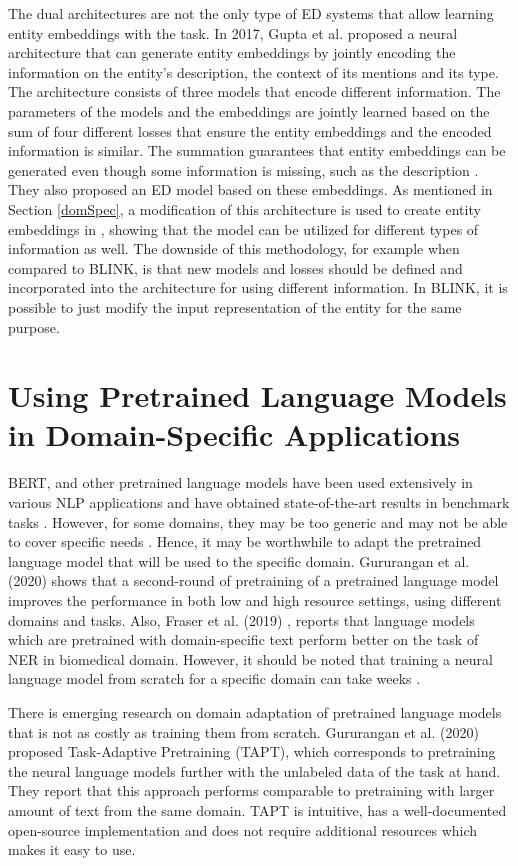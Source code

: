 \documentclass{report}
\theoremstyle{definition}
\theoremstyle{remark}
\begin{document}
The dual architectures are not the only type of ED systems that allow learning entity embeddings with the task. In 2017, Gupta et al. \cite{gupta} proposed a neural architecture that can generate entity embeddings by jointly encoding the information on the entity's description, the context of its mentions and its type. The architecture consists of three models that encode different information. The parameters of the models and the embeddings are jointly learned based on the sum of four different losses that ensure the entity embeddings and the encoded information is similar. The summation guarantees that entity embeddings can be generated even though some information is missing, such as the description \cite{gupta}. They also proposed an ED model based on these embeddings. As mentioned in Section \ref{domSpec}, a modification of this architecture is used to create entity embeddings in \cite{cosmetic}, showing that the model can be utilized for different types of information as well. The downside of this methodology, for example when compared to BLINK, is that new models and losses should be defined and incorporated into the architecture for using different information. In BLINK, it is possible to just modify the input representation of the entity for the same purpose.

\section{Using Pretrained Language Models in Domain-Specific Applications}
\label{preLMDiffDomain}
BERT, and other pretrained language models have been used extensively in various NLP applications and have obtained state-of-the-art results in benchmark tasks \cite{pretrainedLM}. However, for some domains, they may be too generic and may not be able to cover specific needs \cite{quote2}. Hence, it may be worthwhile to adapt the pretrained language model that will be used to the specific domain. Gururangan et al. (2020) \cite{DontStop} shows that a second-round of pretraining of a pretrained language model improves the performance in both low and high resource settings, using different domains and tasks. Also, Fraser et al. (2019) \cite{quote3}, reports that language models which are pretrained with domain-specific text perform better on the task of NER in biomedical domain. However, it should be noted that training a neural language model from scratch for a specific domain can take weeks \cite{tritrain}. 

There is emerging research on domain adaptation of pretrained language models that is not as costly as training them from scratch. Gururangan et al. (2020) \cite{DontStop} proposed Task-Adaptive Pretraining (TAPT), which corresponds to pretraining the neural language models further with the unlabeled data of the task at hand. They report that this approach performs comparable to pretraining with larger amount of text from the same domain. TAPT is intuitive, has a well-documented open-source implementation and does not require additional resources which makes it easy to use. 
\end{document}
